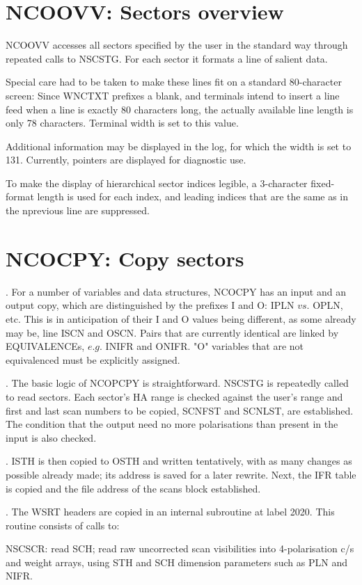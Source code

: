 \section{ NCOOVV: Sectors overview }

	NCOOVV accesses all sectors specified by the user in the standard way
through repeated calls to NSCSTG. For each sector it formats a line of salient
data.

	Special care had to be taken to make these lines fit on a standard
80-character screen: Since WNCTXT prefixes a blank, and terminals intend to
insert a line feed when a line is exactly 80 characters long, the actually
available line length is only 78 characters. Terminal width is set to this
value.

	Additional information may be displayed in the log, for which the width
is set to 131. Currently, pointers are displayed for diagnostic use.

	To make the display of hierarchical sector indices legible, a
3-character fixed-format length is used for each index, and leading indices
that are the same as in the nprevious line are suppressed.


\section{ NCOCPY: Copy sectors }

.       For a number of variables and data structures, NCOCPY has an input and
an output copy, which are distinguished by the prefixes I and O: IPLN $vs.$
OPLN, etc. This is in anticipation of their I and O values being different, as
some already may be, line ISCN and OSCN. Pairs that are currently identical are
linked by EQUIVALENCEs, $e.g.$ INIFR and ONIFR. "O" variables that are not
equivalenced must be explicitly assigned.

.       The basic logic of NCOPCPY is straightforward. NSCSTG is repeatedly
called to read sectors. Each sector's HA range is checked against the user's
range and first and last scan numbers to be copied, SCNFST and SCNLST, are
established. The condition that the output need no more polarisations than
present in the input is also checked.

.       ISTH is then copied to OSTH and written tentatively, with as many
changes as possible already made; its address is saved for a later rewrite.
Next, the IFR table is copied and the file address of the scans block
established.

.       The WSRT headers are copied in an internal subroutine at label 2020.
This routine consists of calls to:
\bi
\item   NSCSCR: read SCH; read raw uncorrected scan visibilities into
4-polarisation c/s and weight arrays, using STH and SCH dimension parameters
such as PLN and NIFR.

